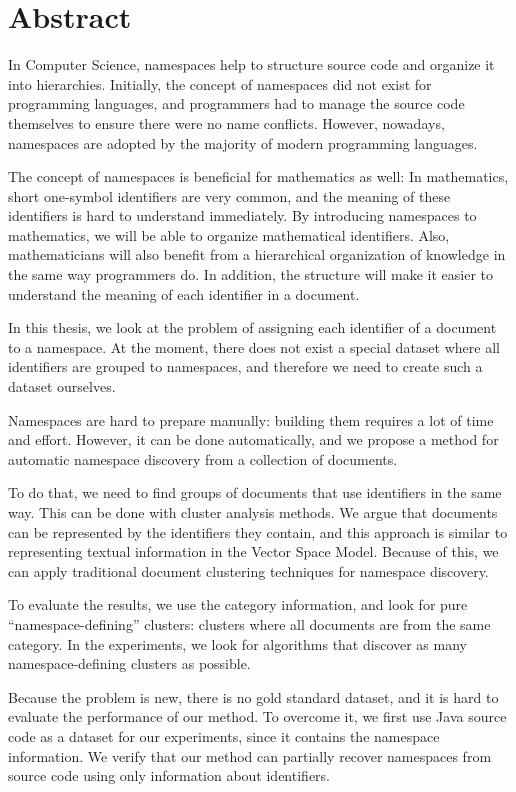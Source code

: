 \section*{Abstract}

In Computer Science, namespaces help to structure source code and
organize it into hierarchies. Initially, the concept of namespaces did not
exist for programming languages, and programmers had to manage the source code themselves
to ensure there were  no name conflicts. However, nowadays, namespaces are 
adopted by the majority of modern programming languages.

The concept of namespaces is beneficial for mathematics as well:
In mathematics, short one-symbol identifiers are very common,
and the meaning of these identifiers is hard to understand immediately.
By introducing namespaces to mathematics, we will be able to organize mathematical 
identifiers. Also, mathematicians will also benefit from a hierarchical organization of
knowledge in the same way programmers do. In addition, the structure
will make it easier to understand the meaning of each identifier in a document.

In this thesis, we look at the problem of assigning each identifier of a document
to a namespace. At the moment, there does not exist a special dataset where
all identifiers are grouped to namespaces, and therefore we need to create
such a dataset ourselves.

Namespaces are hard to prepare manually: building them requires a lot of time and effort.
However, it can be done automatically, and we propose
a method for automatic namespace discovery from a collection of documents.

To do that, we need to find groups of documents that use identifiers in the same way.
This can be done with cluster analysis methods.
We argue that documents can be represented by the identifiers they contain, and this
approach is similar to representing textual information in the Vector Space Model.
Because of this, we can apply traditional document clustering techniques for namespace
discovery.

To evaluate the results, we use the category information, and look for pure
``namespace-defining'' clusters: clusters where all documents are from the same category.
In the experiments, we look for algorithms that discover as many namespace-defining
clusters as possible. 

Because the problem is new, there is no gold standard dataset, and it is
hard to evaluate the performance of our method. To overcome it, we first 
use Java source code as a dataset for our experiments, since it contains the namespace 
information. We verify that our method can partially recover namespaces 
from source code using  only information about identifiers.

